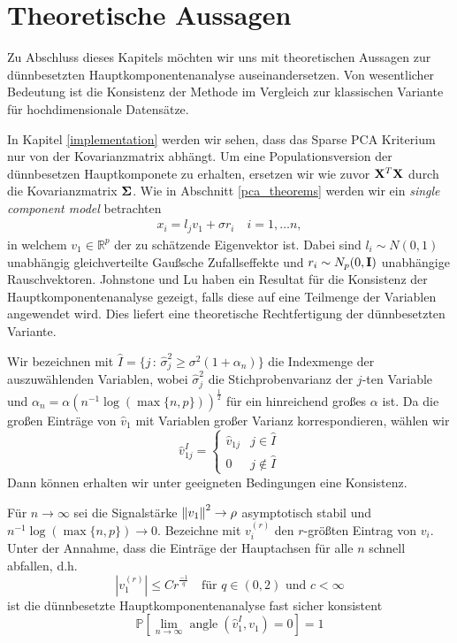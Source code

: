 \section{Theoretische Aussagen} 
\label{spca_theorems}


Zu Abschluss dieses Kapitels möchten wir uns mit theoretischen Aussagen zur dünnbesetzten Hauptkomponentenanalyse auseinandersetzen. Von wesentlicher Bedeutung ist die Konsistenz der Methode im Vergleich zur klassischen Variante für hochdimensionale Datensätze.

In Kapitel \ref{implementation} werden wir sehen, dass das Sparse PCA Kriterium nur von der Kovarianzmatrix abhängt. Um eine Populationsversion der dünnbesetzen Hauptkomponete zu erhalten, ersetzen wir wie zuvor $\mathbf{X}^T \mathbf{X}$ durch die Kovarianzmatrix $\mathbf{\Sigma}$. Wie in Abschnitt \ref{pca_theorems} werden wir ein \textit{single component model} betrachten
\begin{align}
\label{single_component_model_spca}
x_i = l_j v_1 + \sigma r_i \quad i = 1, \ldots n,
\end{align}
in welchem $v_1 \in \mathbb{R}^p$ der zu schätzende Eigenvektor ist. Dabei sind $l_i \sim N(0,1)$ unabhängig gleichverteilte Gaußsche Zufallseffekte und $r_i \sim N_p(0, \mathbf{I})$ unabhängige Rauschvektoren. Johnstone und Lu haben ein Resultat für die Konsistenz der Hauptkomponentenanalyse gezeigt, falls diese auf eine Teilmenge der Variablen angewendet wird. Dies liefert eine theoretische Rechtfertigung der dünnbesetzten Variante.

Wir bezeichnen mit $\hat{I} = \{j \, \colon \, \hat{\sigma}_j^2 \geq \sigma^2 (1 + \alpha_n)\}$ die Indexmenge der auszuwählenden Variablen, wobei $\hat{\sigma}_j^2$ die Stichprobenvarianz der $j$-ten Variable und $\alpha_n = \alpha (n^{-1}\log(\max \{n,p\}))^{\frac{1}{2}}$ für ein hinreichend großes $\alpha$ ist. Da die großen Einträge von $\hat{v}_1$ mit Variablen großer Varianz korrespondieren, wählen wir 
$$\hat{v}_{1j}^I = \begin{cases} 
      \hat{v}_{1j} & j \in \hat{I}\\
      0 & j \not\in \hat{I}
   \end{cases}$$
Dann können erhalten wir unter geeigneten Bedingungen eine Konsistenz.

\begin{thm}
Für $n \to \infty$ sei die Signalstärke $\left\lVert v_1 \right\rVert^2 \to \rho$ asymptotisch stabil und $n^{-1}\log(\max \{n,p\}) \to 0$. Bezeichne mit $v_i^{(r)}$ den $r$-größten Eintrag von $v_i$. Unter der Annahme, dass die Einträge der Hauptachsen für alle $n$ schnell abfallen, d.h.
$$|v_1^{(r)}| \leq Cr^{\frac{-1}{q}} \quad \text{für } q \in (0,2) \text{ und } c < \infty$$
ist die dünnbesetzte Hauptkomponentenanalyse fast sicher konsistent
$$\mathbb{P}\left[\lim_{n \to \infty} \operatorname{angle}(\hat{v}_1^I, v_1) = 0\right] = 1$$ 
\end{thm}

